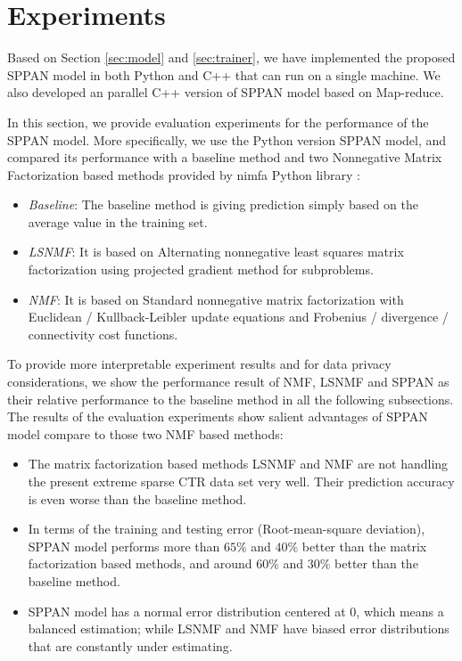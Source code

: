 \section{Experiments}
\label{sec:exp}

Based on Section \ref{sec:model} and \ref{sec:trainer}, we have
implemented the proposed SPPAN model in both Python and C++ that can
run on a single machine. We also developed an parallel C++ version of
SPPAN model based on Map-reduce.

In this section, we provide evaluation experiments for the performance
of the SPPAN model. More specifically, we use the Python version SPPAN
model, and compared its performance with a baseline method and two
Nonnegative Matrix Factorization based methods provided by nimfa
Python library \cite{ZitnikZ12}:

\begin{itemize} \itemsep -2pt
\item {\em Baseline}: The baseline method is giving prediction simply
  based on the average value in the training set.
\item {\em LSNMF}: It is based on Alternating nonnegative least
  squares matrix factorization using projected gradient method for
  subproblems\cite{lin2007projected}.
\item {\em NMF}: It is based on Standard nonnegative matrix
  factorization with Euclidean / Kullback-Leibler update equations and
  Frobenius / divergence / connectivity cost
  functions\cite{lee2001algorithms, brunet2004metagenes}.
\end{itemize}

To provide more interpretable experiment results and for data privacy
considerations, we show the performance result of NMF, LSNMF and SPPAN
as their relative performance to the baseline method in all the
following subsections. The results of the evaluation experiments show
salient advantages of SPPAN model compare to those two NMF based
methods:

\begin{itemize} \itemsep -2pt
\item {} The matrix factorization based methods LSNMF and NMF are not
  handling the present extreme sparse CTR data set very well. Their
  prediction accuracy is even worse than the baseline method.
\item {} In terms of the training and testing error (Root-mean-square
  deviation), SPPAN model performs more than $65\%$ and $40\%$ better
  than the matrix factorization based methods, and around $60\%$ and
  $30\%$ better than the baseline method.
\item {} SPPAN model has a normal error distribution centered at 0,
  which means a balanced estimation; while LSNMF and NMF have biased
  error distributions that are constantly under estimating.
\end{itemize}

